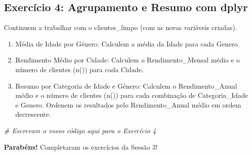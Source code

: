 \documentclass[
]{article}
\newenvironment{Shaded}{\begin{snugshade}}{\end{snugshade}}
\newcommand{\CommentTok}[1]{\textcolor[rgb]{0.56,0.35,0.01}{\textit{#1}}}
\providecommand{\tightlist}{%
  \setlength{\itemsep}{0pt}\setlength{\parskip}{0pt}}
\begin{document}
\subsection{\texorpdfstring{\textbf{Exercício 4:} Agrupamento e Resumo
com
dplyr}{Exercício 4: Agrupamento e Resumo com dplyr}}\label{exercuxedcio-4-agrupamento-e-resumo-com-dplyr}

Continuem a trabalhar com o clientes\_limpo (com as novas variáveis
criadas).

\begin{enumerate}
\def\labelenumi{\arabic{enumi}.}
\tightlist
\item
  Média de Idade por Género: Calculem a média da Idade para cada Genero.
\item
  Rendimento Médio por Cidade: Calculem o Rendimento\_Mensal médio e o
  número de clientes (n()) para cada Cidade.
\item
  Resumo por Categoria de Idade e Género: Calculem o Rendimento\_Anual
  médio e o número de clientes (n()) para cada combinação de
  Categoria\_Idade e Genero. Ordenem os resultados pelo
  Rendimento\_Anual médio em ordem decrescente.
\end{enumerate}

\begin{Shaded}
\begin{Highlighting}[]
\CommentTok{\# Escrevam o vosso código aqui para o Exercício 4}
\end{Highlighting}
\end{Shaded}

\textbf{Parabéns!} Completaram os exercícios da Sessão 3!
\end{document}
